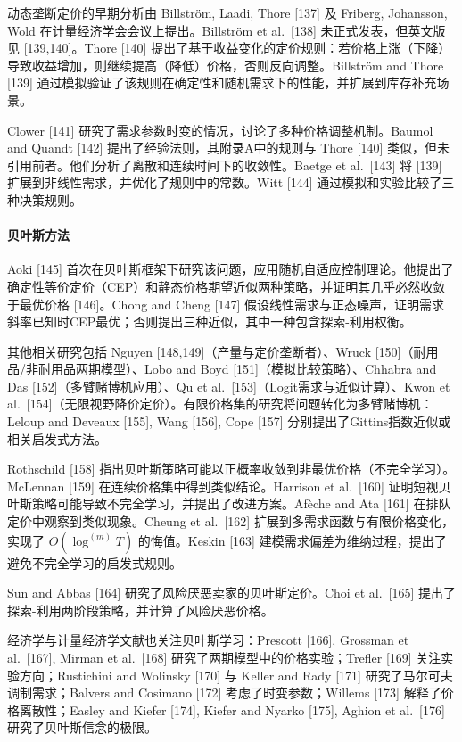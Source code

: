 动态垄断定价的早期分析由 Billström, Laadi, Thore {[}137{]} 及 Friberg, Johansson, Wold 在计量经济学会会议上提出。Billström et al.~{[}138{]} 未正式发表，但英文版见 {[}139,140{]}。Thore {[}140{]} 提出了基于收益变化的定价规则：若价格上涨（下降）导致收益增加，则继续提高（降低）价格，否则反向调整。Billström and Thore {[}139{]} 通过模拟验证了该规则在确定性和随机需求下的性能，并扩展到库存补充场景。

Clower {[}141{]} 研究了需求参数时变的情况，讨论了多种价格调整机制。Baumol and Quandt {[}142{]} 提出了经验法则，其附录A中的规则与 Thore {[}140{]} 类似，但未引用前者。他们分析了离散和连续时间下的收敛性。Baetge et al.~{[}143{]} 将 {[}139{]} 扩展到非线性需求，并优化了规则中的常数。Witt {[}144{]} 通过模拟和实验比较了三种决策规则。

\paragraph{贝叶斯方法}\label{bayesian-approaches}

Aoki {[}145{]} 首次在贝叶斯框架下研究该问题，应用随机自适应控制理论。他提出了确定性等价定价（CEP）和静态价格期望近似两种策略，并证明其几乎必然收敛于最优价格 {[}146{]}。Chong and Cheng {[}147{]} 假设线性需求与正态噪声，证明需求斜率已知时CEP最优；否则提出三种近似，其中一种包含探索-利用权衡。

其他相关研究包括 Nguyen {[}148,149{]}（产量与定价垄断者）、Wruck {[}150{]}（耐用品/非耐用品两期模型）、Lobo and Boyd {[}151{]}（模拟比较策略）、Chhabra and Das {[}152{]}（多臂赌博机应用）、Qu et al.~{[}153{]}（Logit需求与近似计算）、Kwon et al.~{[}154{]}（无限视野降价定价）。有限价格集的研究将问题转化为多臂赌博机：Leloup and Deveaux {[}155{]}, Wang {[}156{]}, Cope {[}157{]} 分别提出了Gittins指数近似或相关启发式方法。

Rothschild {[}158{]} 指出贝叶斯策略可能以正概率收敛到非最优价格（不完全学习）。McLennan {[}159{]} 在连续价格集中得到类似结论。Harrison et al.~{[}160{]} 证明短视贝叶斯策略可能导致不完全学习，并提出了改进方案。Afèche and Ata {[}161{]} 在排队定价中观察到类似现象。Cheung et al.~{[}162{]} 扩展到多需求函数与有限价格变化，实现了 \(O(\log^{(m)} T)\) 的悔值。Keskin {[}163{]} 建模需求偏差为维纳过程，提出了避免不完全学习的启发式规则。

Sun and Abbas {[}164{]} 研究了风险厌恶卖家的贝叶斯定价。Choi et al.~{[}165{]} 提出了探索-利用两阶段策略，并计算了风险厌恶价格。

经济学与计量经济学文献也关注贝叶斯学习：Prescott {[}166{]}, Grossman et al.~{[}167{]}, Mirman et al.~{[}168{]} 研究了两期模型中的价格实验；Trefler {[}169{]} 关注实验方向；Rustichini and Wolinsky {[}170{]} 与 Keller and Rady {[}171{]} 研究了马尔可夫调制需求；Balvers and Cosimano {[}172{]} 考虑了时变参数；Willems {[}173{]} 解释了价格离散性；Easley and Kiefer {[}174{]}, Kiefer and Nyarko {[}175{]}, Aghion et al.~{[}176{]} 研究了贝叶斯信念的极限。


